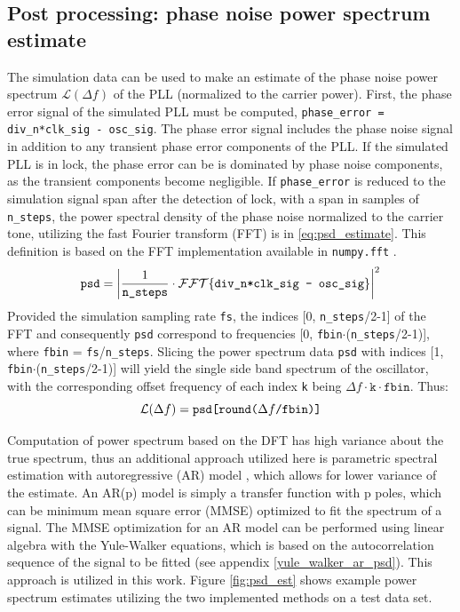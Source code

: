 \subsection{Post processing: phase noise power spectrum estimate}
The simulation data can be used to make an estimate of the phase noise power spectrum $\mathcal{L}(\Delta f)$ of the PLL (normalized to the carrier power). First, the phase error signal of the simulated PLL must be computed, \texttt{phase\_error = div\_n*clk\_sig - osc\_sig}. The phase error signal includes the phase noise signal in addition to any transient phase error components of the PLL. If the simulated PLL is in lock, the phase error can be is dominated by phase noise components, as the transient components become negligible. If \texttt{phase\_error} is reduced to the simulation signal span after the detection of lock, with a span in samples of \texttt{n\_steps}, the power spectral density of the phase noise normalized to the carrier tone, utilizing the fast Fourier transform (FFT) is in \ref{eq:psd_estimate}. This definition is based on the FFT implementation available in \texttt{numpy.fft} \cite{numpy.fft}.
\begin{equation}\label{eq:psd_estimate}
	\text{\texttt{psd}} = \left|\frac{1}{\text{\texttt{n\_steps}}}\cdot\mathcal{FFT}\{\text{\texttt{div\_n*clk\_sig - osc\_sig}}\}\right|^2
\end{equation}
Provided the simulation sampling rate \texttt{fs}, the indices [0, \texttt{n\_steps}/2-1] of the FFT and consequently \texttt{psd} correspond to frequencies [0, \texttt{fbin}$\cdot$(\texttt{n\_steps}/2-1)], where \texttt{fbin} = \texttt{fs}/\texttt{n\_steps}. Slicing the power spectrum data \texttt{psd} with indices [1, \texttt{fbin}$\cdot$(\texttt{n\_steps}/2-1)] will yield the single side band spectrum of the oscillator, with the corresponding offset frequency of each index \texttt{k} being $\Delta f\cdot \mathtt{k}\cdot\mathtt{fbin}$. Thus:
\begin{equation}
	\mathcal{L}(\Delta f) = \text{\texttt{psd[round(}}\Delta f\text{\texttt{/fbin)]}}
\end{equation}

Computation of power spectrum based on the DFT has high variance about the true spectrum, thus an additional approach utilized here is parametric spectral estimation with autoregressive (AR) model \cite{proakis_1993_psd}, which allows for lower variance of the estimate. An AR(p) model is simply a transfer function with p poles, which can be minimum mean square error (MMSE) optimized to fit the spectrum of a signal. The MMSE optimization for an AR model can be performed using linear algebra with the Yule-Walker equations, which is based on the autocorrelation sequence of the signal to be fitted (see appendix \ref{yule_walker_ar_psd}). This approach is utilized in this work. Figure \ref{fig:psd_est} shows example power spectrum estimates utilizing the two implemented methods on a test data set.

